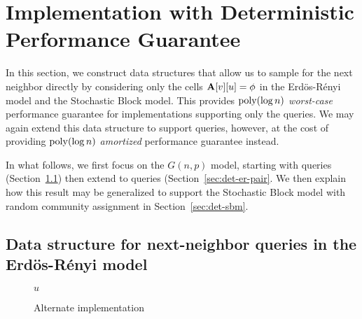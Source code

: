 \section{ Implementation with Deterministic Performance Guarantee}
\label{sec:ER-det}
In this section, we construct data structures that allow us to sample for the next neighbor directly by considering only the cells $\mathbf{A}[v][u]=\phi$ in the Erd\"{o}s-R\'{e}nyi model and the Stochastic Block model. This provides $\mathrm{poly}(\log n)$ \emph{worst-case} performance guarantee for implementations supporting only the  queries. We may again extend this data structure to support  queries, however, at the cost of providing $\mathrm{poly}(\log n)$ \emph{amortized} performance guarantee instead.

In what follows, we first focus on the $G(n,p)$ model, starting with  queries (Section~\ref{sec:det-er}) then extend to  queries (Section~\ref{sec:det-er-pair}. We then explain how this result may be generalized to support the Stochastic Block model with random community assignment in Section~\ref{sec:det-sbm}.

\subsection{Data structure for next-neighbor queries in the Erd\"{o}s-R\'{e}nyi model}\label{sec:det-er}

\begin{wrapfigure}[15]{r}{0.48\textwidth}
\vspace{-2.5em}
\begin{framed}
    \renewcommand\figurename{Algorithm}
    \caption{Alternate implementation}
    \label{alg:exact-coin-toss}
    \begin{algorithmic}
            \Else
                \EndIf
            \EndIf
            \State \Return $u$
        \EndProcedure
    \end{algorithmic}
\end{framed}
\end{wrapfigure}

